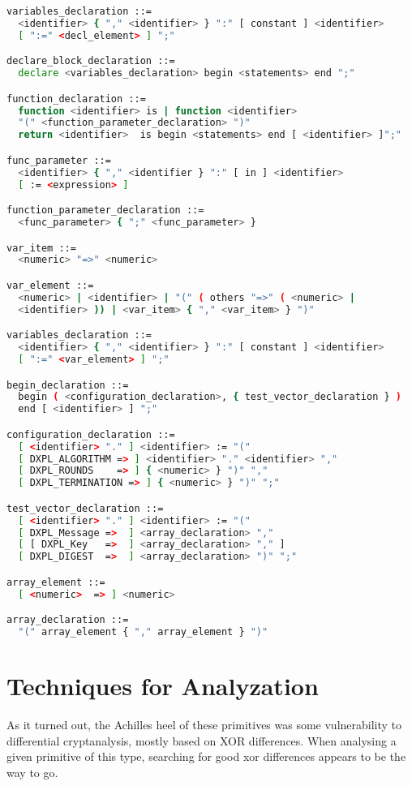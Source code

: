 \documentclass{acmtrans2m}
\begin{document}
\begin{lstlisting}[language=bash,caption=Supported syntax in DARXplorer]
variables_declaration ::=
  <identifier> { "," <identifier> } ":" [ constant ] <identifier>
  [ ":=" <decl_element> ] ";"

declare_block_declaration ::=
  declare <variables_declaration> begin <statements> end ";" 

function_declaration ::=
  function <identifier> is | function <identifier> 
  "(" <function_parameter_declaration> ")"
  return <identifier>  is begin <statements> end [ <identifier> ]";"

func_parameter ::=
  <identifier> { "," <identifier } ":" [ in ] <identifier>
  [ := <expression> ]

function_parameter_declaration ::= 
  <func_parameter> { ";" <func_parameter> }

var_item ::=
  <numeric> "=>" <numeric>

var_element ::=
  <numeric> | <identifier> | "(" ( others "=>" ( <numeric> | 
  <identifier> )) | <var_item> { "," <var_item> } ")" 

variables_declaration ::=
  <identifier> { "," <identifier> } ":" [ constant ] <identifier> 
  [ ":=" <var_element> ] ";"

begin_declaration ::=
  begin ( <configuration_declaration>, { test_vector_declaration } )
  end [ <identifier> ] ";"

configuration_declaration ::= 
  [ <identifier> "." ] <identifier> := "(" 
  [ DXPL_ALGORITHM => ] <identifier> "." <identifier> "," 
  [ DXPL_ROUNDS    => ] { <numeric> } ")" ","
  [ DXPL_TERMINATION => ] { <numeric> } ")" ";"

test_vector_declaration ::=
  [ <identifier> "." ] <identifier> := "("
  [ DXPL_Message =>  ] <array_declaration> ","
  [ [ DXPL_Key   =>  ] <array_declaration> "," ]
  [ DXPL_DIGEST  =>  ] <array_declaration> ")" ";"

array_element ::=
  [ <numeric>  => ] <numeric>

array_declaration ::= 
  "(" array_element { "," array_element } ")"
\end{lstlisting}

\section{Techniques for Analyzation}\label{chapter:techniques}

As it turned out, the Achilles heel of these primitives was some 
vulnerability to differential cryptanalysis, mostly based on XOR 
differences. When analysing a given primitive of this type, searching 
for good xor differences appears to be the way to go.
\end{document}
